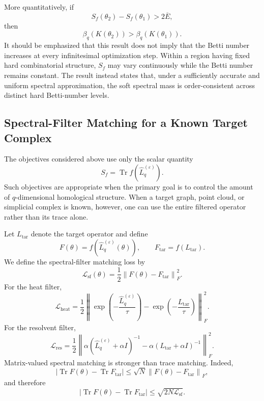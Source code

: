 \documentclass[pdflatex,sn-mathphys-num]{sn-jnl}%
\theoremstyle{thmstyleone}%
\theoremstyle{thmstyletwo}%
\theoremstyle{thmstylethree}%
\begin{document}
More quantitatively, if
\[
S_f(\theta_2)-S_f(\theta_1)
>
2\overline E,
\]
then
\[
\beta_q(K(\theta_2))
>
\beta_q(K(\theta_1)).
\]
It should be emphasized that this result does not imply that the Betti number increases at every infinitesimal optimization step. Within a region having fixed hard combinatorial structure, \(S_f\) may vary continuously while the Betti number remains constant.
The result instead states that, under a sufficiently accurate and uniform spectral approximation, the soft spectral mass is order-consistent across distinct hard Betti-number levels.


\subsection{Spectral-Filter Matching for a Known Target Complex}

The objectives considered above use only the scalar quantity
\[
S_f
=
\operatorname{Tr}
f(\widehat L_q^{(\varepsilon)}).
\]
Such objectives are appropriate when the primary goal is to control the amount of \(q\)-dimensional homological structure.
When a target graph, point cloud, or simplicial complex is known, however, one can use the entire filtered operator rather than its trace alone.

Let $L_{\mathrm{tar}}$
denote the target operator and define
\[
F(\theta)
=
f
\left(
\widehat L_q^{(\varepsilon)}(\theta)
\right),
\qquad
F_{\mathrm{tar}}
=
f(L_{\mathrm{tar}}).
\]
We define the spectral-filter matching loss by
\[
\mathcal L_{\mathrm{sf}}(\theta)
=
\frac12
\left\|
F(\theta)-F_{\mathrm{tar}}
\right\|_F^2.
\]
For the heat filter,
\[
\mathcal L_{\mathrm{heat}}
=
\frac12
\left\|
\exp
\left(
-\frac{
\widehat L_q^{(\varepsilon)}
}{\tau}
\right)
-
\exp
\left(
-\frac{
L_{\mathrm{tar}}
}{\tau}
\right)
\right\|_F^2.
\]
For the resolvent filter,
\[
\mathcal L_{\mathrm{res}}
=
\frac12
\left\|
\alpha
\left(
\widehat L_q^{(\varepsilon)}
+
\alpha I
\right)^{-1}
-
\alpha
\left(
L_{\mathrm{tar}}
+
\alpha I
\right)^{-1}
\right\|_F^2.
\]
Matrix-valued spectral matching is stronger than trace matching. Indeed,
\[
\left|
\operatorname{Tr}F(\theta)
-
\operatorname{Tr}F_{\mathrm{tar}}
\right|
\le
\sqrt{N}
\left\|
F(\theta)-F_{\mathrm{tar}}
\right\|_F,
\]
and therefore
\[
\left|
\operatorname{Tr}F(\theta)
-
\operatorname{Tr}F_{\mathrm{tar}}
\right|
\le
\sqrt{
2N\mathcal L_{\mathrm{sf}}
}.
\]
\end{document}
